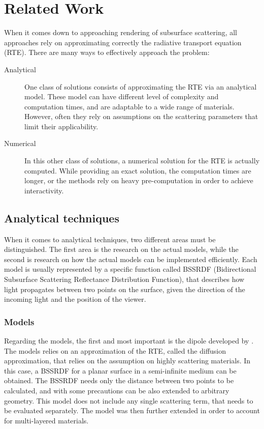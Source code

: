 \chapter{Related Work}
When it comes down to approaching rendering of subsurface scattering, all approaches rely on approximating correctly the radiative transport equation (RTE). There are many ways to effectively approach the problem:

\begin{description}
	\item[Analytical] One class of solutions consists of approximating the RTE via an analytical model. These model can have different level of complexity and computation times, and are adaptable to a wide range of materials. However, often they rely on assumptions on the scattering parameters that limit their applicability.
	\item[Numerical] In this other class of solutions, a numerical solution for the RTE is actually computed. While providing an exact solution, the computation times are longer, or the methods rely on heavy pre-computation in order to achieve interactivity.
\end{description}

\section{Analytical techniques}

When it comes to analytical techniques, two different areas must be distinguished. The first area is the research on the actual models, while the second is research on how the actual models can be implemented efficiently. Each model is usually represented by a specific function called BSSRDF (Bidirectional Subsurface Scattering Reflectance Distribution Function), that describes how light propagates between two points on the surface, given the direction of the incoming light and the position of the viewer. 

\subsection{Models}
Regarding the models, the first and most important is the dipole developed by \cite{Jensen:2001:PMS:383259.383319}. The models relies on an approximation of the RTE, called the diffusion approximation, that relies on the assumption on highly scattering materials. In this case, a BSSRDF for a planar surface in a semi-infinite medium can be obtained. The BSSRDF needs only the distance between two points to be calculated, and with some precautions can be also extended to arbitrary geometry. This model does not include any single scattering term, that needs to be evaluated separately. The model was then further extended in order to account for multi-layered materials\citep{Donner:2005:LDM:1186822.1073308}.

